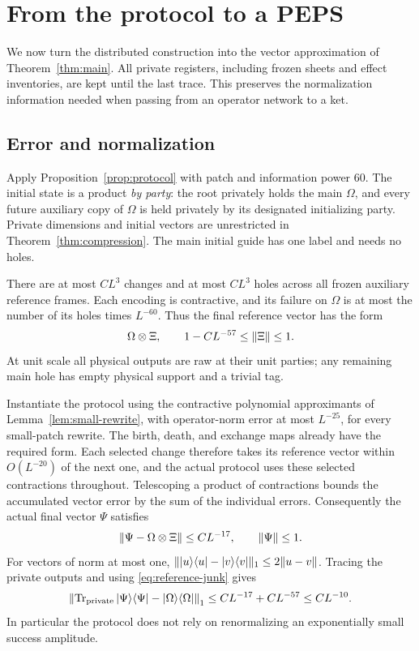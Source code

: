 \section{From the protocol to a PEPS}\label{sec:assembly}

We now turn the distributed construction into the vector approximation of
Theorem~\ref{thm:main}. All private registers, including frozen sheets and
effect inventories, are kept until the last trace. This preserves the
normalization information needed when passing from an operator network
to a ket.

\subsection{Error and normalization}

Apply Proposition~\ref{prop:protocol} with patch and information power $60$.
The initial state is a product \emph{by party}: the root privately holds
the main $\Omega$, and every future auxiliary copy of $\Omega$ is held
privately by its designated initializing party. Private dimensions and
initial vectors are unrestricted in Theorem~\ref{thm:compression}.
The main initial guide has one label and needs no holes.

There are at most $CL^3$ changes and at most $CL^3$ holes across all frozen
auxiliary reference frames. Each encoding is contractive, and its failure
on $\Omega$ is at most the number of its holes times $L^{-60}$. Thus the
final reference vector has the form
\begin{equation}\label{eq:reference-junk}
 \Omega\otimes\Xi,
 \qquad 1-CL^{-57}\le\lVert \Xi\rVert\le1.
\end{equation}
At unit scale all physical outputs are raw at their unit parties; any
remaining main hole has empty physical support and a trivial tag.

Instantiate the protocol using the contractive polynomial approximants
of Lemma~\ref{lem:small-rewrite}, with operator-norm error at most
$L^{-25}$, for every small-patch rewrite.  The birth, death, and exchange
maps already have the required form.  Each selected change therefore takes
its reference vector within $O(L^{-20})$ of the next one, and the actual
protocol uses these selected contractions throughout.  Telescoping a
product of contractions bounds the accumulated vector error by the sum
of the individual errors. Consequently the actual final vector $\Psi$
satisfies
\[
 \lVert \Psi-\Omega\otimes\Xi\rVert\le CL^{-17},\qquad \lVert \Psi\rVert\le1.
\]
For vectors of norm at most one,
$\lVert |u\rangle\langle u|-|v\rangle\langle v|\rVert_1
\le2\lVert u-v\rVert$. Tracing the private outputs and using
\eqref{eq:reference-junk} gives
\begin{equation}\label{eq:protocol-density}
 \left\|\operatorname{Tr}_{\rm private}|\Psi\rangle\langle\Psi|
             -|\Omega\rangle\langle\Omega|\right\|_1
 \le CL^{-17}+CL^{-57}\le CL^{-10}.
\end{equation}
In particular the protocol does not rely on renormalizing an
exponentially small success amplitude.

